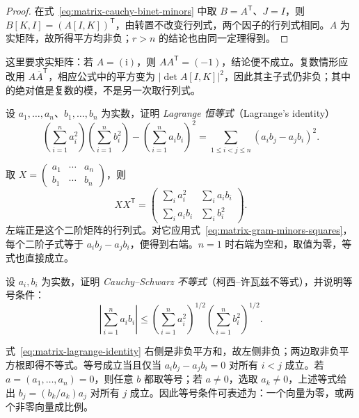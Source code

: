 \begin{proof}
在式~\eqref{eq:matrix-cauchy-binet-minors} 中取 $B=A^{\mathsf T}$、$J=I$，则 $B[K,I]=(A[I,K])^{\mathsf T}$，由转置不改变行列式，两个因子的行列式相同。$A$ 为实矩阵，故所得平方均非负；$r>n$ 的结论也由同一定理得到。
\end{proof}

这里要求实矩阵：若 $A=(\mathrm{i})$，则 $AA^{\mathsf T}=(-1)$，结论便不成立。复数情形应改用 $A\overline A^{\mathsf T}$，相应公式中的平方变为 $|\det A[I,K]|^2$，因此其主子式仍非负；其中的绝对值是复数的模，不是另一次取行列式。

\begin{example}
\label{ex:matrix-lagrange-identity}
设 $a_1,\ldots,a_n$、$b_1,\ldots,b_n$ 为实数，证明 \emph{Lagrange 恒等式}（Lagrange's identity）
\begin{equation}
\label{eq:matrix-lagrange-identity}
    \left(\sum_{i=1}^{n}a_i^2\right)
    \left(\sum_{i=1}^{n}b_i^2\right)
    -\left(\sum_{i=1}^{n}a_ib_i\right)^2
    =\sum_{1\leq i<j\leq n}(a_ib_j-a_jb_i)^2.
\end{equation}
\end{example}

\begin{solve}
取 $X=\begin{pmatrix}a_1&\cdots&a_n\\b_1&\cdots&b_n\end{pmatrix}$，则
\[
    XX^{\mathsf T}
    =\begin{pmatrix}\sum_i a_i^2&\sum_i a_ib_i\\
                     \sum_i a_ib_i&\sum_i b_i^2\end{pmatrix}.
\]
左端正是这个二阶矩阵的行列式。对它应用式~\eqref{eq:matrix-gram-minors-squares}，每个二阶子式等于 $a_ib_j-a_jb_i$，便得到右端。$n=1$ 时右端为空和，取值为零，等式也直接成立。
\end{solve}

\begin{example}
\label{ex:matrix-cauchy-schwarz}
设 $a_i,b_i$ 为实数，证明 \emph{Cauchy--Schwarz 不等式}（柯西--许瓦兹不等式），并说明等号条件：
\begin{equation}
\label{eq:matrix-cauchy-schwarz}
    \left|\sum_{i=1}^{n}a_ib_i\right|
    \leq\left(\sum_{i=1}^{n}a_i^2\right)^{1/2}
         \left(\sum_{i=1}^{n}b_i^2\right)^{1/2}.
\end{equation}
\end{example}

\begin{solve}
式~\eqref{eq:matrix-lagrange-identity} 右侧是非负平方和，故左侧非负；两边取非负平方根即得不等式。等号成立当且仅当 $a_ib_j-a_jb_i=0$ 对所有 $i<j$ 成立。若 $a=(a_1,\ldots,a_n)=0$，则任意 $b$ 都取等号；若 $a\ne0$，选取 $a_k\ne0$，上述等式给出 $b_j=(b_k/a_k)a_j$ 对所有 $j$ 成立。因此等号条件可表述为：一个向量为零，或两个非零向量成比例。
\end{solve}

